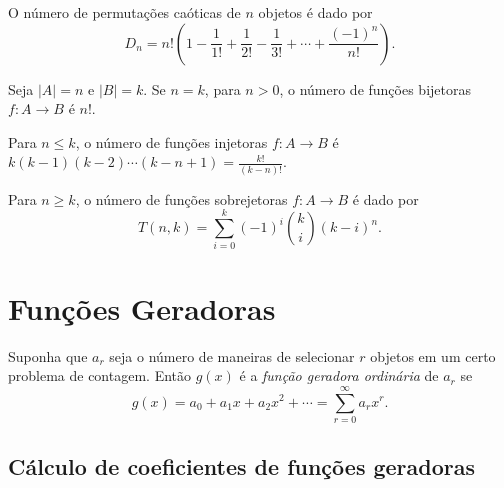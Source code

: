 \documentclass{article}
\begin{document}
\begin{prop}
    O número de permutações caóticas de \(n\) objetos é dado por
    \begin{equation}
        D_n = n! \left( 1 - \frac{1}{1!} + \frac{1}{2!} - \frac{1}{3!} + \cdots + \frac{(-1)^n}{n!} \right).
    \end{equation}
\end{prop}

\begin{thm}
    Seja \(\vert A \vert = n\) e \(\vert B \vert = k\). Se \(n=k\), para \(n>0\), o número de funções bijetoras \(f: A \to B\) é \(n!\).
\end{thm}

\begin{thm}
    Para \(n \leq k\), o número de funções injetoras \(f: A \to B\) é \(k(k-1)(k-2)\cdots(k-n+1) = \displaystyle\frac{k!}{(k-n)!}\).
\end{thm}

\begin{thm}
    Para \(n \geq k\), o número de funções sobrejetoras \(f: A \to B\) é dado por
    \begin{equation}
        T(n,k) = \sum_{i=0}^{k} (-1)^i \binom{k}{i} (k-i)^n.
    \end{equation}
\end{thm}

\section{Funções Geradoras}

\begin{defn}
    Suponha que \(a_r\) seja o número de maneiras de selecionar \(r\) objetos em um certo problema de contagem. Então \(g(x)\) é a \emph{função geradora ordinária} de \(a_r\) se
    \begin{equation}
        g(x) = a_0 + a_1 x + a_2 x^2 + \cdots = \sum_{r=0}^{\infty} a_r x^r.
    \end{equation}
\end{defn}

\subsection{Cálculo de coeficientes de funções geradoras}
\end{document}
